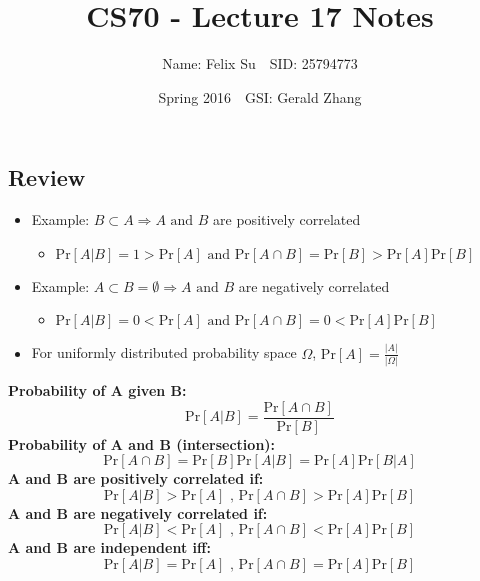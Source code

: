 \documentclass{article}\usepackage{amsmath,amssymb,amsthm,tikz,tkz-graph,color,chngpage,soul,hyperref,csquotes,graphicx,floatrow, listings}\newcommand*{\QEDB}{\hfill\ensuremath{\square}}\newtheorem*{prop}{Proposition}\renewcommand{\theenumi}{\alph{enumi}}\usepackage[shortlabels]{enumitem}\usepackage[nobreak=true]{mdframed}\usetikzlibrary{matrix,calc}\MakeOuterQuote{"}\usepackage[margin=0.75in]{geometry} \newtheorem{theorem}{Theorem}\newcommand{\Z}{\mathbb Z}\newcommand{\R}{\mathbb R}\newcommand{\Q}{\mathbb Q}\newcommand{\N}{\mathbb N}\newcommand{\x}[1]{\textrm{ #1 }}\newcommand{\pr}{\textrm{Pr}}
\title{CS70 - Lecture 17 Notes}
\author{Name: Felix Su$\quad$SID: 25794773}
\date{Spring 2016$\quad$GSI: Gerald Zhang}
\begin{document}
\maketitle

\subsection*{Review}
\begin{itemize}
    \item Example: $B \subset A \Rightarrow A \x{and} B$ are positively correlated
    \begin{itemize}
        \item $\pr[A|B]=1>\pr[A]\x{  and  }\pr[A \cap B]=\pr[B]>\pr[A]\pr[B]$
    \end{itemize}
    \item Example: $A \subset B = \emptyset \Rightarrow A \x{and} B$ are negatively correlated
    \begin{itemize}
        \item $\pr[A|B]=0<\pr[A]\x{  and  }\pr[A \cap B]=0<\pr[A]\pr[B]$
    \end{itemize}
    \item For uniformly distributed probability space $\Omega$, $\pr[A]=\frac{|A|}{|\Omega|}$
\end{itemize}
\begin{mdframed}
\textbf{Probability of A given B:}
\begin{equation}\pr[A|B]=\frac{\pr[A\cap B]}{\pr[B]}\end{equation}
\textbf{Probability of A and B (intersection):}
\begin{equation}\pr[A\cap B]=\pr[B]\pr[A|B]=\pr[A]\pr[B|A]\end{equation}
\textbf{A and B are positively correlated if:}
\begin{equation}\pr[A|B]>\pr[A]\x{  ,  }\pr[A\cap B]>\pr[A]\pr[B]\end{equation}
\textbf{A and B are negatively correlated if:}
\begin{equation}\pr[A|B]<\pr[A]\x{  ,  }\pr[A\cap B]<\pr[A]\pr[B]\end{equation}
\textbf{A and B are independent iff:}
\begin{equation}\pr[A|B]=\pr[A]\x{  ,  }\pr[A\cap B]=\pr[A]\pr[B]\end{equation}
\end{mdframed}
\end{document}
